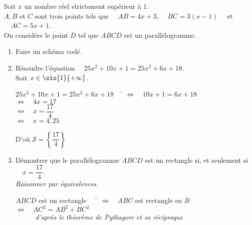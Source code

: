 \documentclass[a4paper,11pt,exos]{nsi}
\begin{document}
\exo{}
\textcolor{UGLiBlue}{Soit $x$ un nombre réel strictement supérieur à $1$.\\
$A, B$ et $C$ sont trois points tels que $\quad AB=4x+3$, $\quad BC=3(x-1)\quad$ et $\quad AC=5x+1$.\\
On considère le point $D$ tel que $ABCD$ est un parallélogramme.}
\begin{enumerate}
	\item 	\textcolor{UGLiBlue}{Faire un schéma codé.}
	\begin{center}
    \end{center}
	\item   \textcolor{UGLiBlue}{Résoudre l'équation $\quad 25x^2+10x+1=25x^2+6x+18$.}\\[.5em]
	Soit $x\in\oio{1}{+\infty}$.
    \begin{tabbing}
        $25x^2+10x+1=25x^2+6x+18\quad$  \=  $\iff\quad 10x+1=6x+18$\\
        \>  $\iff\quad 4x=17$\\
        \>  $\iff\quad x=\dfrac{17}{4}$\\
        \>  $\iff\quad x=4,25$
    \end{tabbing}
    D'où $\mathcal{S}=\left\{\dfrac{17}{4}\right\}$
	\item 	\textcolor{UGLiBlue}{Démontrer que le parallélogramme $ABCD$ est un rectangle si, et seulement si $\quad x=\dfrac{17}{4}$.\\
	\textit{Raisonner par équivalences.}}
    \begin{tabbing}
        $ABCD$ est un rectangle $\quad$ \= $\iff\quad ABC$ est rectangle en $B$\\
        \>  $\iff\quad AC^2=AB^2+BC^2$\\
        \>  $\phantom{\iff} \quad$ \textit{d'après le théorème de Pythagore et sa réciproque}\\

\end{tabbing}
\end{enumerate}
\end{document}
